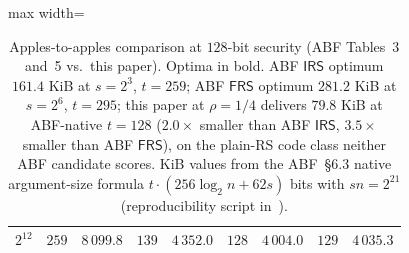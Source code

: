 \documentclass[11pt]{article}
\theoremstyle{definition}
\theoremstyle{remark}
\begin{document}
\begin{table}[h]
\begin{adjustbox}{max width=\textwidth}
\begin{tabular}{rrrrrrrrr}
$2^{12}$ & $259$ & $8\,099.8$ & $139$ & $4\,352.0$ & $128$ & $4\,004.0$ & $129$ & $4\,035.3$ \\
\bottomrule
\end{tabular}
\end{adjustbox}
\caption{Apples-to-apples comparison at $128$-bit security (ABF
Tables~3 and~5 vs.\ this paper). Optima in bold. ABF $\mathsf{IRS}$
optimum $161.4$ KiB at $s = 2^{3}$, $t = 259$; ABF $\mathsf{FRS}$
optimum $281.2$ KiB at $s = 2^{6}$, $t = 295$; this paper at
$\rho=1/4$ delivers $\mathbf{79.8}$ KiB at ABF-native $t=128$
($\mathbf{2.0\times}$ smaller than ABF $\mathsf{IRS}$,
$\mathbf{3.5\times}$ smaller than ABF $\mathsf{FRS}$), on the
plain-RS code class neither ABF candidate scores. KiB values from the
ABF~\S 6.3 native argument-size formula
$t \cdot (256 \log_2 n + 62 s)$ bits with $sn = 2^{21}$
(reproducibility script in~\cite{CompanionRepo}).}
\label{tab:abf-128b-irs}
\end{table}
\end{document}
